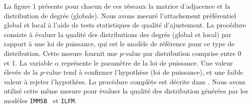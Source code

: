 \documentclass[french]{hermes-journal}
\newcommand{\ilfm}{\texttt{ILFM}}
\newcommand{\immsb}{\texttt{IMMSB}}
\begin{document}


La figure 1 présente pour chacun de ces réseaux la matrice d'adjacence et la distribution de degrés (globale). Nous avons mesuré l'attachement préférentiel global et local à l'aide de tests statistiques de qualité d'ajustement. La procédure consiste à évaluer la qualité des distributions des degrés (global et local) par rapport à une loi de puissance, qui est le modèle de référence pour ce type de distribution. Cette mesure fournit une $p$-value par distribution comprise entre 0 et 1. La variable $\alpha$ représente le paramètre de la loi de puissance. Une valeur élevée de la $p$-value tend à confirmer l'hypothèse (loi de puissance), et une faible valeur à rejeter l'hypothèse. La procédure complète est décrite dans \cite{clauset2009power}.
Nous avons utilisé cette même mesure pour évaluer la qualité des distribution générées par les modèles \immsb~ et \ilfm.
\end{document}
